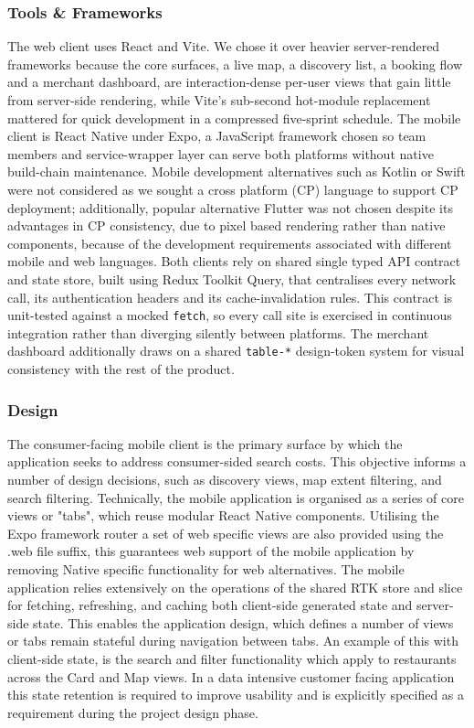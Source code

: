 \documentclass[conference]{IEEEtran}
\begin{document}
\subsubsection{Tools \& Frameworks}
The web client uses React and Vite. We chose it over heavier server-rendered frameworks because the core surfaces, a live map, a discovery list, a booking flow and a merchant dashboard, are interaction-dense per-user views that gain little from server-side rendering, while Vite's sub-second hot-module replacement mattered for quick development in a compressed five-sprint schedule. The mobile client is React Native under Expo, a JavaScript framework chosen so team members and service-wrapper layer can serve both platforms without native build-chain maintenance. Mobile development alternatives such as Kotlin or Swift were not considered as we sought a cross platform (CP) language to support CP deployment; additionally, popular alternative Flutter was not chosen despite its advantages in CP consistency, due to pixel based rendering rather than native components, because of the development requirements associated with different mobile and web languages. Both clients rely on shared single typed API contract and state store, built using Redux Toolkit Query, that centralises every network call, its authentication headers and its cache-invalidation rules. This contract is unit-tested against a mocked \texttt{fetch}, so every call site is exercised in continuous integration rather than diverging silently between platforms. The merchant dashboard additionally draws on a shared \texttt{table-*} design-token system for visual consistency with the rest of the product.

\subsubsection{Design}

The consumer-facing mobile client is the primary surface by which the application seeks to address consumer-sided search costs. This objective informs a number of design decisions, such as discovery views, map extent filtering, and search filtering. Technically, the mobile application is organised as a series of core views or "tabs", which reuse modular React Native components. Utilising the Expo framework router a set of web specific views are also provided using the .web file suffix, this guarantees web support of the mobile application by removing Native specific functionality for web alternatives. The mobile application relies extensively on the operations of the shared RTK store and slice for fetching, refreshing, and caching both client-side generated state and server-side state. This enables the application design, which defines a number of views or tabs remain stateful during navigation between tabs. An example of this with client-side state, is the search and filter functionality which apply to restaurants across the Card and Map views. In a data intensive customer facing application this state retention is required to improve usability and is explicitly specified as a requirement during the project design phase.
\end{document}
